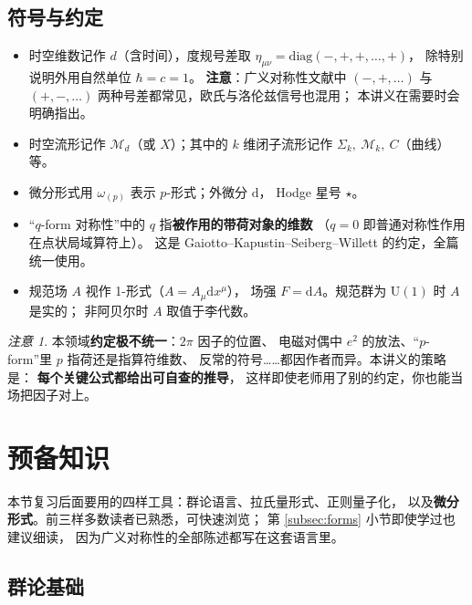 \documentclass[UTF8,a4paper,11pt]{ctexart}
\theoremstyle{plain}
\theoremstyle{definition}
\theoremstyle{remark}
\newtheorem{warning}{注意}[section]
\newcommand{\ext}{\mathrm{d}}          %
\newcommand{\hs}{\star}                %
\newcommand{\Uone}{\mathrm{U}(1)}
\newcommand{\Mfd}{\mathcal{M}}
\newcommand{\Ssurf}{\Sigma}
\begin{document}
\subsection{符号与约定}

\begin{itemize}
  \item 时空维数记作 $d$（含时间），度规号差取
        $\eta_{\mu\nu}=\mathrm{diag}(-,+,+,\dots,+)$，
        除特别说明外用自然单位 $\hbar=c=1$。
        \textbf{注意}：广义对称性文献中 $(-,+,\dots)$ 与 $(+,-,\dots)$
        两种号差都常见，欧氏与洛伦兹信号也混用；
        本讲义在需要时会明确指出。
  \item 时空流形记作 $\Mfd_d$（或 $X$）；其中的 $k$ 维闭子流形记作
        $\Ssurf_k,\ \Mfd_k,\ C$（曲线）等。
  \item 微分形式用 $\omega_{(p)}$ 表示 $p$-形式；外微分 $\ext$，
        Hodge 星号 $\hs$。
  \item “$q$-form 对称性”中的 $q$ 指\textbf{被作用的带荷对象的维数}
        （$q=0$ 即普通对称性作用在点状局域算符上）。
        这是 Gaiotto--Kapustin--Seiberg--Willett 的约定，全篇统一使用。
  \item 规范场 $A$ 视作 1-形式（$A=A_\mu\ext x^\mu$），
        场强 $F=\ext A$。规范群为 $\Uone$ 时 $A$ 是实的；
        非阿贝尔时 $A$ 取值于李代数。
\end{itemize}

\begin{warning}
本领域\textbf{约定极不统一}：$2\pi$ 因子的位置、
电磁对偶中 $e^2$ 的放法、“$p$-form”里 $p$ 指荷还是指算符维数、
反常的符号……都因作者而异。本讲义的策略是：
\textbf{每个关键公式都给出可自查的推导}，
这样即使老师用了别的约定，你也能当场把因子对上。
\end{warning}

\section{预备知识}
\label{sec:prelim}

本节复习后面要用的四样工具：群论语言、拉氏量形式、正则量子化，
以及\textbf{微分形式}。前三样多数读者已熟悉，可快速浏览；
第 \ref{subsec:forms} 小节即使学过也建议细读，
因为广义对称性的全部陈述都写在这套语言里。

\subsection{群论基础}
\label{subsec:group}
\end{document}
